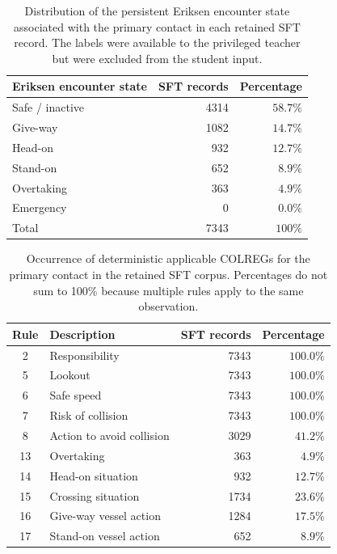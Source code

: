 \documentclass[10pt]{reportMaster}
\begin{document}
\begin{table}[htbp]
    \centering
    \begin{tabular}{l rr}
        \hline
        \textbf{Eriksen encounter state} &
        \textbf{SFT records} &
        \textbf{Percentage} \\
        \hline
        Safe / inactive & 4314 & $58.7\%$ \\
        Give-way        & 1082 & $14.7\%$ \\
        Head-on         & 932  & $12.7\%$ \\
        Stand-on        & 652  & $8.9\%$ \\
        Overtaking      & 363  & $4.9\%$ \\
        Emergency       & 0    & $0.0\%$ \\
        \hline
        Total           & 7343 & $100\%$ \\
        \hline
    \end{tabular}
    \caption{Distribution of the persistent Eriksen encounter state associated
    with the primary contact in each retained SFT record. The labels were
    available to the privileged teacher but were excluded from the student
    input.}
    \label{tab:sft_eriksen_state_distribution}
\end{table}

\begin{table}[htbp]
    \centering
    \begin{tabular}{c l rr}
        \hline
        \textbf{Rule} & \textbf{Description} &
        \textbf{SFT records} & \textbf{Percentage} \\
        \hline
        2  & Responsibility              & 7343 & $100.0\%$ \\
        5  & Lookout                     & 7343 & $100.0\%$ \\
        6  & Safe speed                  & 7343 & $100.0\%$ \\
        7  & Risk of collision           & 7343 & $100.0\%$ \\
        8  & Action to avoid collision   & 3029 & $41.2\%$ \\
        13 & Overtaking                  & 363  & $4.9\%$ \\
        14 & Head-on situation           & 932  & $12.7\%$ \\
        15 & Crossing situation          & 1734 & $23.6\%$ \\
        16 & Give-way vessel action      & 1284 & $17.5\%$ \\
        17 & Stand-on vessel action      & 652  & $8.9\%$ \\
        \hline
    \end{tabular}
    \caption{Occurrence of deterministic applicable COLREGs for the primary
    contact in the retained SFT corpus. Percentages do not sum to 100\% because
    multiple rules apply to the same observation.}
    \label{tab:sft_colreg_distribution}
\end{table}
\end{document}
